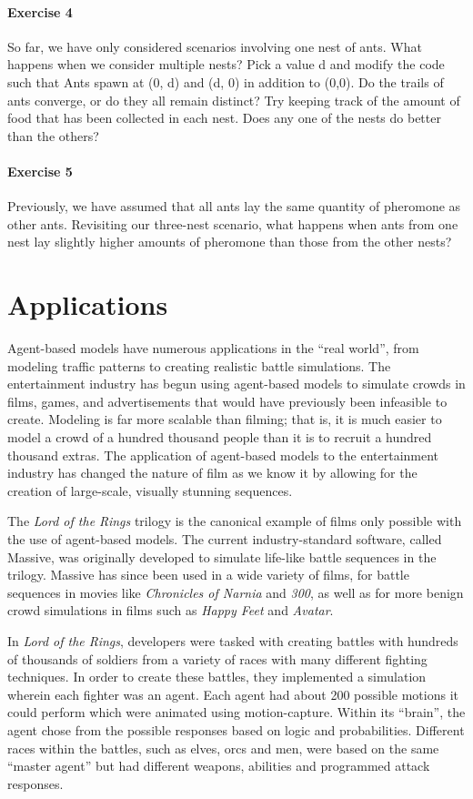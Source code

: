 \paragraph{Exercise 4}
So far, we have only considered scenarios involving one nest of ants.  What happens when we consider multiple nests? Pick a value d and modify the code such that Ants spawn at (0, d) and (d, 0) in addition to (0,0).  Do the trails of ants converge, or do they all remain distinct? Try keeping track of the amount of food that has been collected in each nest. Does any one of the nests do better than the others?
\paragraph{Exercise 5}
Previously, we have assumed that all ants lay the same quantity of pheromone as other ants.  Revisiting our three-nest scenario, what happens when ants from one nest lay slightly higher amounts of pheromone than those from the other nests?


\section{Applications}

Agent-based models have numerous applications in the ``real world'', from modeling traffic patterns to creating realistic battle simulations.  The entertainment industry has begun using agent-based models to simulate crowds in films, games, and advertisements that would have previously been infeasible to create.  Modeling is far more scalable than filming; that is, it is much easier to model a crowd of a hundred thousand people than it is to recruit a hundred thousand extras.  The application of agent-based models to the entertainment industry has changed the nature of film as we know it by allowing for the creation of large-scale, visually stunning sequences.

The \emph{Lord of the Rings} trilogy is the canonical example of films only possible with the use of agent-based models.  The current industry-standard software, called Massive, was originally developed to simulate life-like battle sequences in the trilogy.   Massive has since been used in a wide variety of films, for battle sequences in movies like \emph{Chronicles of Narnia} and \emph{300}, as well as for more benign crowd simulations in films such as \emph{Happy Feet} and \emph{Avatar}.

In \emph{Lord of the Rings}, developers were tasked with creating battles with hundreds of thousands of soldiers from a variety of races with many different fighting techniques.  In order to create these battles, they implemented a simulation wherein each fighter was an agent.  Each agent had about 200 possible motions it could perform which were animated using motion-capture.  Within its ``brain'', the agent chose from the possible responses based on logic and probabilities.  Different races within the battles, such as elves, orcs and men, were based on the same ``master agent'' but had different weapons, abilities and programmed attack responses.  

